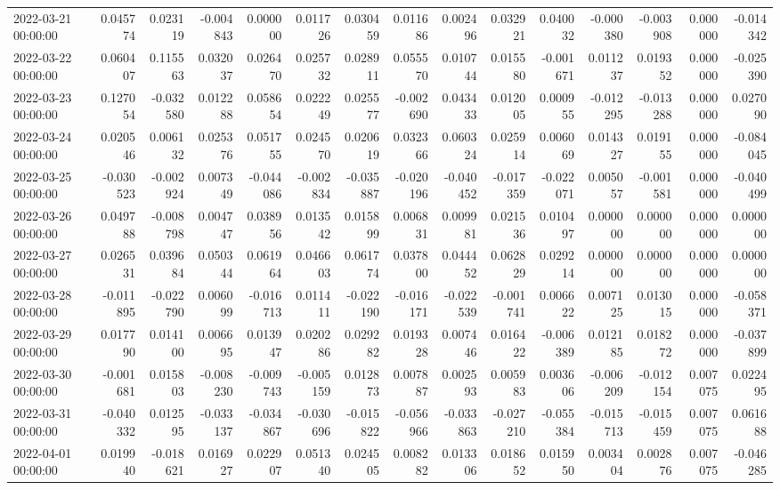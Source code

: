 \begin{tabular}{lrrrrrrrrrrrrrr}
2022-03-21 00:00:00 & 0.045774 & 0.023119 & -0.004843 & 0.000000 & 0.011726 & 0.030459 & 0.011686 & 0.002496 & 0.032921 & 0.040032 & -0.000380 & -0.003908 & 0.000000 & -0.014342 \\
2022-03-22 00:00:00 & 0.060407 & 0.115563 & 0.032037 & 0.026470 & 0.025732 & 0.028911 & 0.055570 & 0.010744 & 0.015580 & -0.001671 & 0.011237 & 0.019352 & 0.000000 & -0.025390 \\
2022-03-23 00:00:00 & 0.127054 & -0.032580 & 0.012288 & 0.058654 & 0.022249 & 0.025577 & -0.002690 & 0.043433 & 0.012005 & 0.000955 & -0.012295 & -0.013288 & 0.000000 & 0.027090 \\
2022-03-24 00:00:00 & 0.020546 & 0.006132 & 0.025376 & 0.051755 & 0.024570 & 0.020619 & 0.032366 & 0.060324 & 0.025914 & 0.006069 & 0.014327 & 0.019155 & 0.000000 & -0.084045 \\
2022-03-25 00:00:00 & -0.030523 & -0.002924 & 0.007349 & -0.044086 & -0.002834 & -0.035887 & -0.020196 & -0.040452 & -0.017359 & -0.022071 & 0.005057 & -0.001581 & 0.000000 & -0.040499 \\
2022-03-26 00:00:00 & 0.049788 & -0.008798 & 0.004747 & 0.038956 & 0.013542 & 0.015899 & 0.006831 & 0.009981 & 0.021536 & 0.010497 & 0.000000 & 0.000000 & 0.000000 & 0.000000 \\
2022-03-27 00:00:00 & 0.026531 & 0.039684 & 0.050344 & 0.061964 & 0.046603 & 0.061774 & 0.037800 & 0.044452 & 0.062829 & 0.029214 & 0.000000 & 0.000000 & 0.000000 & 0.000000 \\
2022-03-28 00:00:00 & -0.011895 & -0.022790 & 0.006099 & -0.016713 & 0.011411 & -0.022190 & -0.016171 & -0.022539 & -0.001741 & 0.006622 & 0.007125 & 0.013015 & 0.000000 & -0.058371 \\
2022-03-29 00:00:00 & 0.017790 & 0.014100 & 0.006695 & 0.013947 & 0.020286 & 0.029282 & 0.019328 & 0.007446 & 0.016422 & -0.006389 & 0.012185 & 0.018272 & 0.000000 & -0.037899 \\
2022-03-30 00:00:00 & -0.001681 & 0.015803 & -0.008230 & -0.009743 & -0.005159 & 0.012873 & 0.007887 & 0.002593 & 0.005983 & 0.003606 & -0.006209 & -0.012154 & 0.007075 & 0.022495 \\
2022-03-31 00:00:00 & -0.040332 & 0.012595 & -0.033137 & -0.034867 & -0.030696 & -0.015822 & -0.056966 & -0.033863 & -0.027210 & -0.055384 & -0.015713 & -0.015459 & 0.007075 & 0.061688 \\
2022-04-01 00:00:00 & 0.019940 & -0.018621 & 0.016927 & 0.022907 & 0.051340 & 0.024505 & 0.008282 & 0.013306 & 0.018652 & 0.015950 & 0.003404 & 0.002876 & 0.007075 & -0.046285 \\

\end{tabular}

